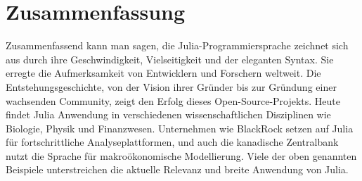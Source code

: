 
\section{Zusammenfassung}
Zusammenfassend kann man sagen, die Julia-Programmiersprache  zeichnet sich aus durch ihre Geschwindigkeit, Vielseitigkeit und der eleganten Syntax. Sie erregte die Aufmerksamkeit von Entwicklern und Forschern weltweit. Die Entstehungsgeschichte, von der Vision ihrer Gründer bis zur Gründung einer wachsenden Community, zeigt den Erfolg dieses Open-Source-Projekts. Heute findet Julia Anwendung in verschiedenen wissenschaftlichen Disziplinen wie Biologie, Physik und Finanzwesen. Unternehmen wie BlackRock setzen auf Julia für fortschrittliche Analyseplattformen, und auch die kanadische Zentralbank nutzt die Sprache für makroökonomische Modellierung. Viele der oben genannten Beispiele unterstreichen die aktuelle Relevanz und breite Anwendung von Julia.
